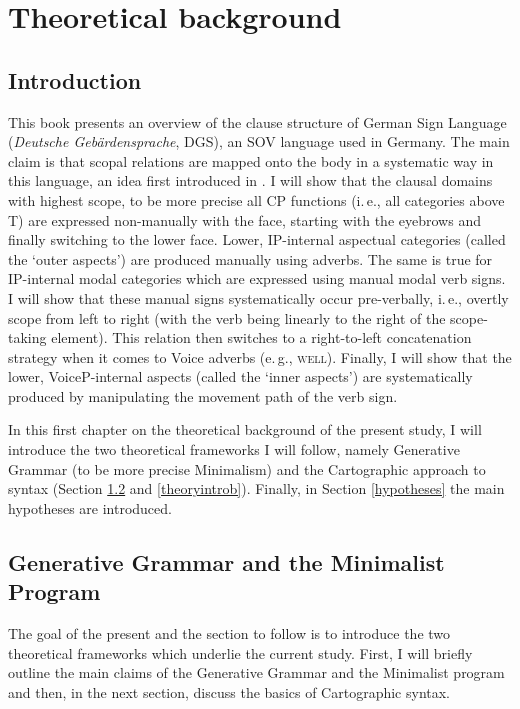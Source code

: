 \chapter{Theoretical background}\label{chaptertheoreticalbackground}
\section{Introduction}
This book presents an overview of the clause structure of German Sign Language (\textit{Deutsche Gebärdensprache}, DGS), an SOV language used in Germany. The main claim is that scopal relations are mapped onto the body in a systematic way in this language, an idea first introduced in \citet{bross2017scope}. I will show that the clausal domains with highest scope, to be more precise all CP functions (i.\,e., all categories above T) are expressed non-manually with the face, starting with the eyebrows and finally switching to the lower face. Lower, IP-internal aspectual categories (called the `outer aspects') are produced manually using adverbs. The same is true for IP-internal modal categories which are expressed using manual modal verb signs. I will show that these manual signs systematically occur pre-verbally, i.\,e., overtly scope from left to right (with the verb being linearly to the right of the scope-taking element). This relation then switches to a right-to-left concatenation strategy when it comes to Voice adverbs (e.\,g., \textsc{well}). Finally, I will show that the lower, VoiceP-internal aspects (called the `inner aspects') are systematically produced by manipulating the movement path of the verb sign. 

In this first chapter on the theoretical background of the present study, I will introduce the two theoretical frameworks I will follow, namely Generative Grammar (to be more precise Minimalism) and the Cartographic approach to syntax (Section \ref{theoryintroa} and \ref{theoryintrob}). Finally, in Section \ref{hypotheses} the main hypotheses are introduced.%



\section{Generative Grammar and the Minimalist Program}\label{theoryintroa}
The goal of the present and the section to follow is to introduce the two theoretical frameworks which underlie the current study. First, I will briefly outline the main claims of the Generative Grammar and the Minimalist program and then, in the next section, discuss the basics of Cartographic syntax. 

